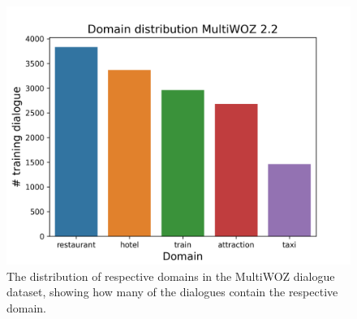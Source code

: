 \begin{figure}[h]
    \centering
    \includegraphics[width=\textwidth]{images/multiwoz-distribution.png}
    \caption{The distribution of respective domains in the MultiWOZ dialogue dataset, showing how many of the dialogues contain the respective domain.}
    \label{02:fig:mw-dist}
\end{figure}


